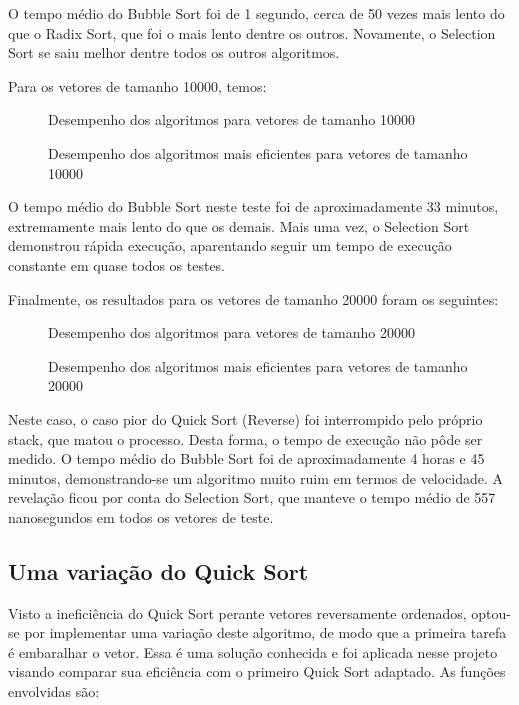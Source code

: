 \documentclass[12pt,a4paper]{article}
\begin{document}
O tempo médio do Bubble Sort foi de 1 segundo, cerca de 50 vezes mais lento do que o Radix Sort, que foi o mais lento dentre os outros. Novamente, o Selection Sort se saiu melhor dentre todos os outros algoritmos.

Para os vetores de tamanho 10000, temos:

\begin{figure}[h]
	\centering
	\caption{Desempenho dos algoritmos para vetores de tamanho 10000}
\end{figure}

\pagebreak

\begin{figure}[h]
	\centering
	\caption{Desempenho dos algoritmos mais eficientes para vetores de tamanho 10000}
\end{figure}

O tempo médio do Bubble Sort neste teste foi de aproximadamente 33 minutos, extremamente mais lento do que os demais. Mais uma vez, o Selection Sort demonstrou rápida execução, aparentando seguir um tempo de execução constante em quase todos os testes.

Finalmente, os resultados para os vetores de tamanho 20000 foram os seguintes:

\begin{figure}[h]
	\centering
	\caption{Desempenho dos algoritmos para vetores de tamanho 20000}
\end{figure}

\pagebreak

\begin{figure}[h]
	\centering
	\caption{Desempenho dos algoritmos mais eficientes para vetores de tamanho 20000}
\end{figure}

Neste caso, o caso pior do Quick Sort (Reverse) foi interrompido pelo próprio stack, que matou o processo. Desta forma, o tempo de execução não pôde ser medido. O tempo médio do Bubble Sort foi de aproximadamente 4 horas e 45 minutos, demonstrando-se um algoritmo muito ruim em termos de velocidade. A revelação ficou por conta do Selection Sort, que manteve o tempo médio de 557 nanosegundos em todos os vetores de teste.

\subsection{Uma variação do Quick Sort}
Visto a ineficiência do Quick Sort perante vetores reversamente ordenados, optou-se por implementar uma variação deste algoritmo, de modo que a primeira tarefa é embaralhar o vetor. Essa é uma solução conhecida e foi aplicada nesse projeto visando comparar sua eficiência com o primeiro Quick Sort adaptado. As funções envolvidas são:
\end{document}
